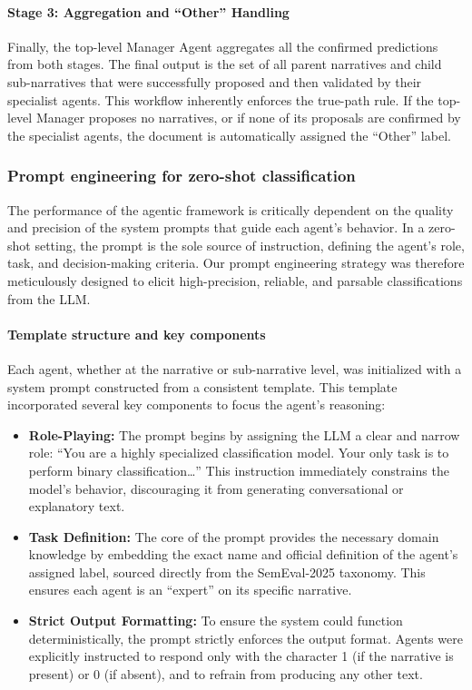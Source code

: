 
\paragraph{Stage 3: Aggregation and ``Other'' Handling}
Finally, the top-level Manager Agent aggregates all the confirmed predictions from both stages. The final output is the set of all parent narratives and child sub-narratives that were successfully proposed and then validated by their specialist agents. This workflow inherently enforces the true-path rule. If the top-level Manager proposes no narratives, or if none of its proposals are confirmed by the specialist agents, the document is automatically assigned the ``Other'' label.

\subsubsection{Prompt engineering for zero-shot classification}

The performance of the agentic framework is critically dependent on the quality and precision of the system prompts that guide each agent's behavior. In a zero-shot setting, the prompt is the sole source of instruction, defining the agent's role, task, and decision-making criteria. Our prompt engineering strategy was therefore meticulously designed to elicit high-precision, reliable, and parsable classifications from the LLM.

\paragraph{Template structure and key components}
Each agent, whether at the narrative or sub-narrative level, was initialized with a system prompt constructed from a consistent template. This template incorporated several key components to focus the agent's reasoning:

\begin{itemize}
  \item \textbf{Role-Playing:} The prompt begins by assigning the LLM a clear and narrow role: ``You are a highly specialized classification model. Your only task is to perform binary classification\ldots'' This instruction immediately constrains the model's behavior, discouraging it from generating conversational or explanatory text.
  \item \textbf{Task Definition:} The core of the prompt provides the necessary domain knowledge by embedding the exact name and official definition of the agent's assigned label, sourced directly from the SemEval-2025 taxonomy. This ensures each agent is an ``expert'' on its specific narrative.
  \item \textbf{Strict Output Formatting:} To ensure the system could function deterministically, the prompt strictly enforces the output format. Agents were explicitly instructed to respond only with the character 1 (if the narrative is present) or 0 (if absent), and to refrain from producing any other text.
\end{itemize}

